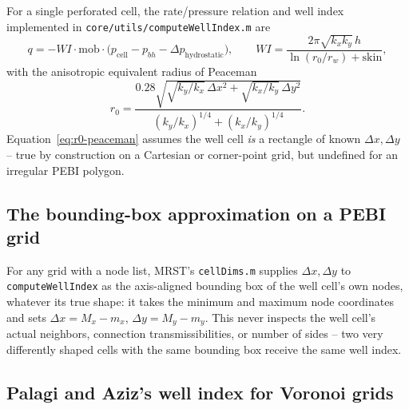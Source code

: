 \documentclass[preprint,11pt]{elsarticle}
\begin{document}
For a single perforated cell, the rate/pressure relation and well index
implemented in \texttt{core/utils/computeWellIndex.m} are
\begin{equation}
q = -WI\cdot\mathrm{mob}\cdot\big(p_{\mathrm{cell}} - p_{bh} - \Delta
p_{\mathrm{hydrostatic}}\big), \qquad
WI = \frac{2\pi\sqrt{k_x k_y}\,h}{\ln(r_0/r_w) + \mathrm{skin}},
\label{eq:wi-peaceman}
\end{equation}
with the anisotropic equivalent radius of Peaceman~\cite{peaceman1983}
\begin{equation}
r_0 = \frac{0.28\sqrt{\sqrt{k_y/k_x}\,\Delta x^2 +
\sqrt{k_x/k_y}\,\Delta y^2}}{(k_y/k_x)^{1/4}+(k_x/k_y)^{1/4}}.
\label{eq:r0-peaceman}
\end{equation}
Equation~\eqref{eq:r0-peaceman} assumes the well cell \emph{is} a
rectangle of known $\Delta x,\Delta y$ -- true by construction on a
Cartesian or corner-point grid, but undefined for an irregular PEBI
polygon.

\subsection{The bounding-box approximation on a PEBI grid}

For any grid with a node list, MRST's \texttt{cellDims.m} supplies
$\Delta x,\Delta y$ to \texttt{computeWellIndex} as the axis-aligned
bounding box of the well cell's own nodes, whatever its true shape: it
takes the minimum and maximum node coordinates and sets $\Delta x = M_x -
m_x$, $\Delta y = M_y - m_y$. This never inspects the well cell's actual
neighbors, connection transmissibilities, or number of sides -- two very
differently shaped cells with the same bounding box receive the same well
index.

\subsection{Palagi and Aziz's well index for Voronoi grids}
\end{document}

